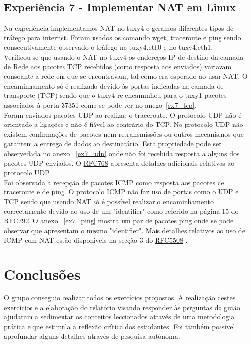 \documentclass[11pt,a4paper,reqno]{report}
\numberwithin{equation}{section}
\begin{document}
\section{Experiência 7 - Implementar NAT em Linux}

Na experiência implementamos NAT no tuxy4 e geramos diferentes tipos de tráfego para internet. Foram usados os comando wget, traceroute e ping sendo consecutivamente observado o tráfego no tuxy4.eth0 e no tuxy4.eth1.\\

Verificou-se que usando o NAT no tuxy4 os endereços IP de destino da camada de Rede nos pacotes TCP recebidos (como resposta aos enviados) variavam consoante a rede em que se encontravam, tal como era esperado ao usar NAT. O encaminhamento só é realizado devido às portas indicadas na camada de transporte (TCP) sendo que o tuxy4 re-encaminhou para o tuxy1 pacotes associados à porta 37351 como se pode ver no anexo~\ref{ex7_tcp}.\\

Foram enviados pacotes UDP ao realizar o traceroute. O protocolo UDP não é orientado a ligações e não é fiável ao contrário do TCP. No protocolo UDP não existem confirmações de pacotes nem retransmissões ou outros mecanismos que garantem a entrega de dados ao destinatário. Esta propriedade pode ser observedada no anexo ~\ref{ex7_udp} onde não foi recebida resposta a alguns dos pacotes UDP enviados. O \href{https://www.ietf.org/rfc/rfc768.txt}{RFC768} apresenta detalhes adicionais relativos ao protocolo UDP.\\

Foi observada a recepção de pacotes ICMP como resposta aos pacotes de traceroute e de ping. O protocolo ICMP não faz uso de portas como o UDP e TCP sendo que usando NAT só é possível realizar o encaminhamento correctamente devido ao uso de um "identifier" como referido na página 15 do \href{https://www.ietf.org/rfc/rfc792.txt}{RFC792}. O anexo ~\ref{ex7_ping} mostra um par de pacotes ping onde se pode observar que apresentam o mesmo "identifier". Mais detalhes relativos ao uso de ICMP com NAT estão disponíveis na secção 3 do \href{https://www.ietf.org/rfc/rfc5508.txt}{RFC5508} . 

\pagebreak
\chapter{Conclusões}

O grupo conseguio realizar todos os exercícios propostos. A realização destes exercícios e a elaboração do relatório visando responder às perguntas do guião ajudaram a sedimentar os conceitos leccionados através de uma metodologia prática e que estimula a reflexão crítica dos estudantes. Foi também possível aprofundar alguns detalhes através de pesquisa autónoma. 
\end{document}
